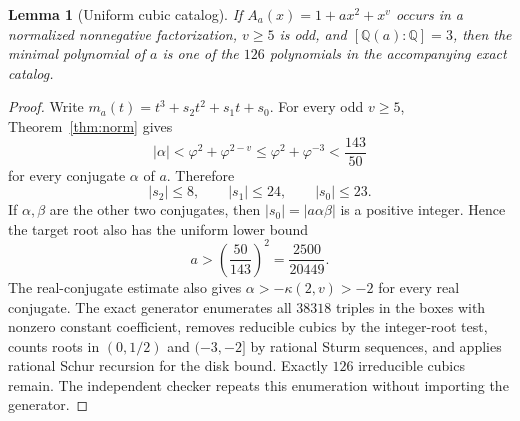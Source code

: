 \documentclass[11pt]{article}
\newtheorem{lemma}[theorem]{Lemma}
\theoremstyle{remark}
\newcommand{\Q}{\mathbb Q}
\newcommand{\ph}{\varphi}
\numberwithin{equation}{section}
\begin{document}
\begin{lemma}[Uniform cubic catalog]\label{lem:cubiccatalog}
If $A_a(x)=1+a x^2+x^v$ occurs in a normalized nonnegative factorization,
$v\ge5$ is odd, and $[\Q(a):\Q]=3$, then the minimal polynomial of $a$ is one
of the $126$ polynomials in the accompanying exact catalog.
\end{lemma}
\begin{proof}
Write $m_a(t)=t^3+s_2t^2+s_1t+s_0$.  For every odd $v\ge5$,
Theorem~\ref{thm:norm} gives
\[
 |\alpha|<\ph^2+\ph^{2-v}\le \ph^2+\ph^{-3}<\frac{143}{50}
\]
for every conjugate $\alpha$ of $a$.  Therefore
\[
 |s_2|\le8,\qquad |s_1|\le24,\qquad |s_0|\le23.
\]
If $\alpha,\beta$ are the other two conjugates, then
$|s_0|=|a\alpha\beta|$ is a positive integer.  Hence the target root also has
the uniform lower bound
\[
 a>\left(\frac{50}{143}\right)^2=\frac{2500}{20449}.
\]
The real-conjugate estimate also gives $\alpha>-\kappa(2,v)>-2$ for every
real conjugate.  The exact generator enumerates all $38318$ triples in the
boxes with nonzero constant coefficient, removes reducible cubics by the
integer-root test, counts roots in $(0,1/2)$ and $(-3,-2]$ by rational Sturm
sequences, and applies rational Schur recursion for the disk bound.  Exactly
$126$ irreducible cubics remain.  The independent checker repeats this
enumeration without importing the generator.
\end{proof}
\end{document}
